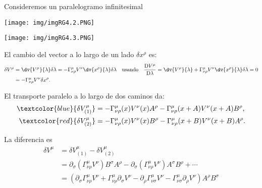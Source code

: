 \documentclass[../main]{subfiles}
\begin{document}
\begin{adjustwidth}{0pt}{-100pt}
Consideremos un paralelogramo infinitesimal \\
\begin{minipage}{0.5\textwidth}
    \begin{center}
        \texttt{[image: img/imgRG4.2.PNG]}
    \end{center}
\end{minipage}
\begin{minipage}{0.5\textwidth}
    \begin{center}
        \texttt{[image: img/imgRG4.3.PNG]}
    \end{center}
\end{minipage}

El cambio del vector a lo largo de un lado $\delta x^{\rho}$ es:
\begin{equation}
    \begin{aligned}
        \delta V^{\mu}&=\dv{V^{\mu}}{\lambda}\delta \lambda = -\Gamma^{\mu}_{\nu\rho} V^{\nu} \dv{x^{\rho}}{\lambda} \delta \lambda \quad \text{usando} \quad \dfrac{\mathrm{D}V^{\mu}}{\mathrm{D}\lambda}=\dv{V^{\mu}}{\lambda}+\Gamma^{\mu}_{\nu\rho}V^{\nu}\dv{x^{\rho}}{\lambda}\delta\lambda=0\\
        &=-\Gamma^{\mu}_{\nu\rho}V^{\nu}\delta x^{\rho}.
    \end{aligned}
\end{equation}

El transporte paralelo a lo largo de dos caminos da:
\begin{align}
    \textcolor{blue}{\delta V^{\mu}_{(1)}}&=-\Gamma^{\mu}_{\nu\rho}(x)V^{\nu}(x)A^{\rho}-\Gamma^{\mu}_{\nu\rho}(x+A)V^{\nu}(x+A)B^{\rho},\\
    \textcolor{red}{\delta V^{\mu}_{{(2)}}}&=-\Gamma^{\mu}_{\nu\rho}(x)V^{\nu}(x)B^{\rho}-\Gamma^{\mu}_{\nu\rho}(x+B)V^{\nu}(x+B)A^{\rho}.
\end{align}

La diferencia es 
\begin{equation}
    \begin{aligned}
        \delta V^{\mu} &= \delta V^{\mu}_{(1)}-\delta V^{\mu}_{(2)}\\
        &=\partial_{\sigma}\left(\Gamma^{\mu}_{\nu\rho}V^{\nu}\right)B^{\sigma}A^{\rho}-\partial_{\sigma}(\Gamma^{\mu}_{\nu\rho}V^{\nu})A^{\sigma}B^{\rho}+\cdots \\
        &=\left(\partial_{\sigma}\Gamma^{\mu}_{\nu\rho}V^{\nu}+\Gamma^{\mu}_{\nu\rho}\partial_{\sigma}V^{\nu}-\partial_{\rho}\Gamma^{\mu}_{\nu\sigma}V^{\nu}-\Gamma^{\mu}_{\nu\sigma}\partial_{\rho}V^{\nu}\right)A^{\rho}B^{\sigma}
    \end{aligned}
\end{equation}


\end{adjustwidth}
\end{document}

